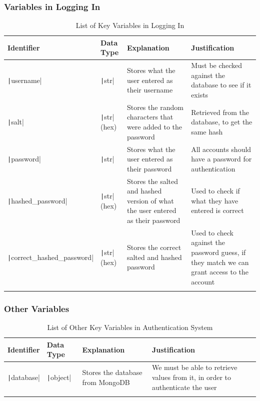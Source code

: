 \documentclass[12pt]{report}
\newcommand{\pil}[1]{\protect\texttt|#1|}
\begin{document}
\subsubsection{Variables in Logging In}
\begin{center}
\begin{longtable}{ | m{3cm} | m{4cm}| m{4cm} | m{4cm} |} 
    \hline
    \textbf{Identifier} & \textbf{Data Type} & \textbf{Explanation}  & \textbf{Justification} \\ 
    \hline
    \pil{username} & \pil{str} & Stores what the user entered as their username & Must be checked against the database to see if it exists \\ 
    \hline
    \pil{salt} & \pil{str} (hex) & Stores the random characters that were added to the password & Retrieved from the database, to get the same hash \\ 
    \hline
    \pil{password} & \pil{str} & Stores what the user entered as their password & All accounts should have a password for authentication \\ 
    \hline
    \pil{hashed_password} & \pil{str} (hex) & Stores the salted and hashed version of what the user entered as their password & Used to check if what they have entered is correct \\ 
    \hline
    \pil{correct_hashed_password} & \pil{str} (hex) & Stores the correct salted and hashed password & Used to check against the password guess, if they match we can grant access to the account \\ 
    \hline
\caption{List of Key Variables in Logging In}
\end{longtable}
\end{center}

\subsubsection{Other Variables}
\begin{center}
\begin{longtable}{ | m{3cm} | m{4cm}| m{4cm} | m{4cm} |} 
    \hline
    \textbf{Identifier} & \textbf{Data Type} & \textbf{Explanation}  & \textbf{Justification} \\ 
    \hline
    \pil{database} & \pil{object} & Stores the database from MongoDB & We must be able to retrieve values from it, in order to authenticate the user \\ 
    \hline
\caption{List of Other Key Variables in Authentication System}
\end{longtable}
\end{center}
\end{document}
